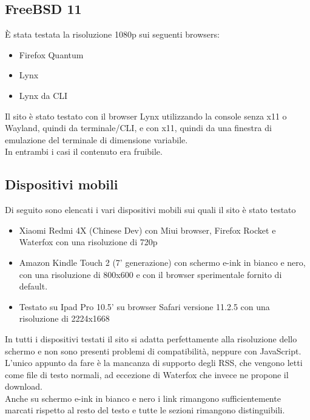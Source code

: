 \documentclass[openany, a4paper, 12pt]{report}
\begin{document}
				\subsection{FreeBSD 11}
				\`{E} stata testata la risoluzione 1080p sui seguenti browsers:
				\begin{itemize}
					\item Firefox Quantum
					\item Lynx
					\item Lynx da CLI
				\end{itemize}
				Il sito è stato testato con il browser Lynx utilizzando la console senza x11 o Wayland, quindi da terminale/CLI, e con x11, quindi da una finestra di emulazione del terminale di dimensione variabile.\\
				In entrambi i casi il contenuto era fruibile.

				\subsection{Dispositivi mobili}
				Di seguito sono elencati i vari dispositivi mobili sui quali il sito è stato testato
				\begin{itemize}
				\item Xiaomi Redmi 4X (Chinese Dev) con Miui browser, Firefox Rocket e Waterfox con una risoluzione di 720p
				\item Amazon Kindle Touch 2 (7' generazione) con schermo e-ink in bianco e nero, con una risoluzione di 800x600 e con il browser sperimentale fornito di default.
        		\item Testato su Ipad Pro 10.5' su browser Safari versione 11.2.5 con una risoluzione di 2224x1668 
				\end{itemize}
			
				In tutti i dispositivi testati il sito si adatta perfettamente alla risoluzione dello schermo e non sono presenti problemi di compatibilità, neppure con JavaScript.\\
				L'unico appunto da fare è la mancanza di supporto degli RSS, che vengono letti come file di testo normali, ad eccezione di Waterfox che invece ne propone il download.\\
				Anche su schermo e-ink in bianco e nero i link rimangono sufficientemente marcati rispetto al resto del testo e tutte le sezioni rimangono distinguibili.
			
\end{document}
